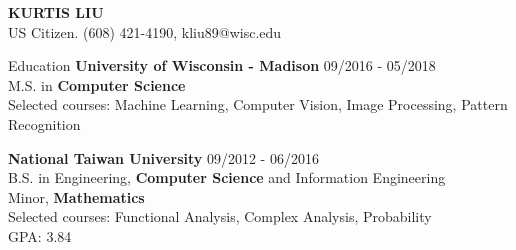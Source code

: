 \documentclass{resume} %
\begin{document}
\begin{center}
{\MakeUppercase{\bf Kurtis Liu}}\\
US Citizen.
(608) 421-4190, kliu89@wisc.edu
\end{center}


\begin{rSection}{Education}
{\bf University of Wisconsin - Madison} \hfill {09/2016 - 05/2018}\\ 
M.S. in {\bf Computer Science} \\
Selected courses:  Machine Learning, Computer Vision, Image Processing, Pattern Recognition


{\bf National Taiwan University} \hfill   {09/2012 - 06/2016}\\ 
B.S. in Engineering,  {\bf Computer Science} and Information Engineering\\
Minor, {\bf Mathematics} \\
Selected courses: Functional Analysis, Complex Analysis, Probability\\
GPA: 3.84
\end{rSection}
\end{document}
